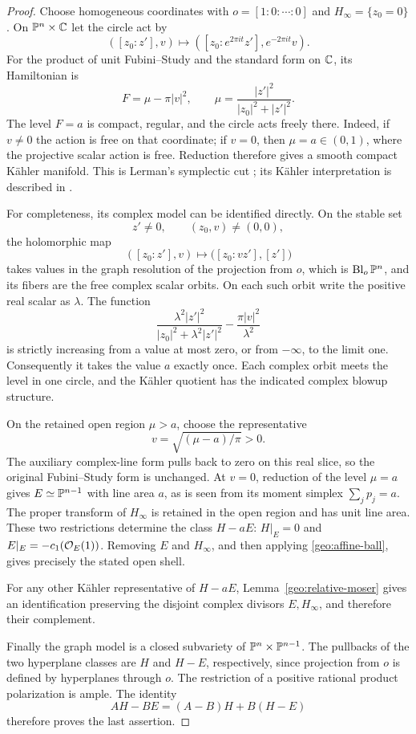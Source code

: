 \begin{proof}
Choose homogeneous coordinates with
\(o=[1:0:\cdots:0]\) and \(H_\infty=\{z_0=0\}\).
On \(\mathbb P^n\times\mathbb C\) let the circle act by
\[
 ([z_0:z'],v)\longmapsto
 ([z_0:e^{2\pi it}z'],e^{-2\pi it}v).
\]
For the product of unit Fubini--Study and the standard form on
\(\mathbb C\), its Hamiltonian is
\[
 F=\mu-\pi|v|^2,\qquad
 \mu=\frac{|z'|^2}{|z_0|^2+|z'|^2}.
\]
The level \(F=a\) is compact, regular, and the circle acts freely
there. Indeed, if \(v\ne0\) the action is free on that coordinate;
if \(v=0\), then \(\mu=a\in(0,1)\), where the projective scalar
action is free. Reduction therefore gives a smooth compact
K\"ahler manifold. This is Lerman's symplectic cut
\cite[Section~1.1]{Lerman1995}; its K\"ahler interpretation is
described in \cite[Section~2]{BurnsGuilleminLerman2002}.

For completeness, its complex model can be identified directly.
On the stable set
\[
 z'\ne0,\qquad (z_0,v)\ne(0,0),
\]
the holomorphic map
\[
 ([z_0:z'],v)\longmapsto
 \bigl([z_0:vz'],[z']\bigr)
\]
takes values in the graph resolution of the projection from
\(o\), which is \(\operatorname{Bl}_o\mathbb P^n\), and its fibers are the free
complex scalar orbits. On each such orbit write the positive
real scalar as \(\lambda\). The function
\[
 \frac{\lambda^2|z'|^2}{|z_0|^2+\lambda^2|z'|^2}
 -\frac{\pi|v|^2}{\lambda^2}
\]
is strictly increasing from a value at most zero, or from
\(-\infty\), to the limit one. Consequently it takes the value
\(a\) exactly once. Each complex orbit meets the level in one
circle, and the K\"ahler quotient has the indicated complex
blowup structure.

On the retained open region \(\mu>a\), choose the representative
\[
 v=\sqrt{(\mu-a)/\pi}>0.
\]
The auxiliary complex-line form pulls back to zero on this
real slice, so the original Fubini--Study form is unchanged.
At \(v=0\), reduction of the level \(\mu=a\) gives \(E\simeq
\mathbb P^{n-1}\) with line area \(a\), as is seen from its moment
simplex \(\sum_jp_j=a\). The proper transform of \(H_\infty\)
is retained in the open region and has unit line area.
These two restrictions determine the class \(H-aE\):
\(H|_E=0\) and \(E|_E=-c_1(\mathcal O_E(1))\).
Removing \(E\) and \(H_\infty\), and then applying
\eqref{geo:affine-ball}, gives precisely the stated open shell.

For any other K\"ahler representative of \(H-aE\),
Lemma~\ref{geo:relative-moser} gives an identification preserving
the disjoint complex divisors \(E,H_\infty\), and therefore their
complement.

Finally the graph model is a closed subvariety of
\(\mathbb P^n\times\mathbb P^{n-1}\). The pullbacks of the two hyperplane
classes are \(H\) and \(H-E\), respectively, since projection
from \(o\) is defined by hyperplanes through \(o\).
The restriction of a positive rational product polarization is
ample. The identity
\[
 AH-BE=(A-B)H+B(H-E)
\]
therefore proves the last assertion.
\end{proof}
